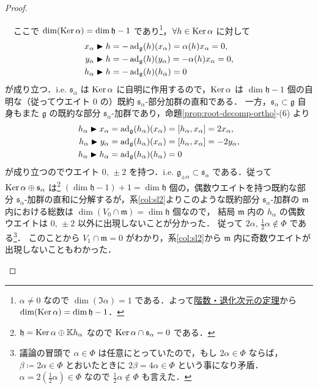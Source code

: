 \documentclass[rep_main]{subfiles}
\begin{document}
\begin{proof}
\begin{description}
		　ここで $\dim (\operatorname{Ker} \alpha) = \dim \mathfrak{h} - 1$ であり\footnote{$\alpha \neq 0$ なので $\dim (\Im \alpha) = 1$ である．よって\hyperref[col:rank-nullity]{階数・退化次元の定理}から $\dim (\operatorname{Ker} \alpha) = \dim \mathfrak{h} - 1$．}，$\forall h \in \operatorname{Ker} \alpha$ に対して
		\begin{align}
			x_\alpha \blacktriangleright h &= -\operatorname{ad}_{\mathfrak{g}}(h)(x_\alpha) = \alpha(h)x_\alpha = 0, \\
			y_\alpha \blacktriangleright h &= -\operatorname{ad}_{\mathfrak{g}}(h)(y_\alpha) = -\alpha(h)x_\alpha = 0, \\
			h_\alpha \blacktriangleright h &= -\operatorname{ad}_{\mathfrak{g}}(h)(h_\alpha) = 0
		\end{align}
		が成り立つ．i.e. $\mathfrak{s}_\alpha$ は $\operatorname{Ker} \alpha$ に自明に作用するので，$\operatorname{Ker} \alpha$ は $\dim \mathfrak{h} - 1$ 個の自明な（従ってウエイト $0$ の）既約 $\mathfrak{s}_\alpha$-部分加群の直和である．
		一方，$\mathfrak{s}_\alpha \subset \mathfrak{g}$ 自身もまた $\mathfrak{g}$ の既約な部分 $\mathfrak{s}_\alpha$-加群であり，命題\ref{prop:root-decomp-ortho}-(6) より
		\begin{align}
			h_\alpha \btr x_\alpha &= \ad_{\mathfrak{g}}(h_\alpha)(x_\alpha) = \comm{h_\alpha}{x_\alpha} = 2x_\alpha, \\
			h_\alpha \btr y_\alpha &= \ad_{\mathfrak{g}}(h_\alpha)(x_\alpha) = \comm{h_\alpha}{x_\alpha} = -2y_\alpha, \\
			h_\alpha \btr h_\alpha &= \ad_{\mathfrak{g}}(h_\alpha)(h_\alpha) = 0
		\end{align}
		が成り立つのでウエイト $0,\, \pm 2$ を持つ．i.e. $\mathfrak{g}_{\pm \alpha} \subset \mathfrak{s}_\alpha$ である．従って $\operatorname{Ker} \alpha \oplus \mathfrak{s}_\alpha$ は\footnote{$\mathfrak{h} = \operatorname{Ker} \alpha \oplus \mathbb{K}h_\alpha$ なので $\operatorname{Ker} \alpha \cap \mathfrak{s}_\alpha = 0$ である．} 
		$(\dim \mathfrak{h} - 1) + 1 = \dim \mathfrak{h}$ 個の，偶数ウエイトを持つ既約な部分 $\mathfrak{s}_\alpha$-加群の直和に分解するが，系\ref{col:sl2}よりこのような既約部分 $\mathfrak{s}_\alpha$-加群の $\mathfrak{m}$ 内における総数は $\dim (V_0 \cap \mathfrak{m}) = \dim \mathfrak{h}$ 個なので，
		結局 $\mathfrak{m}$ 内の $h_\alpha$ の偶数ウエイトは $0,\, \pm 2$ 以外に出現しないことが分かった．
		従って $2\alpha,\, \frac{1}{2}\alpha \notin \Phi$ である\footnote{議論の冒頭で $\alpha \in \Phi$ は任意にとっていたので，もし $2\alpha \in \Phi$ ならば，$\beta \coloneqq 2\alpha \in \Phi$ とおいたときに $2\beta = 4\alpha \in \Phi$ という事になり矛盾．$\alpha = 2 (\frac{1}{2}\alpha) \in \Phi$ なので $\frac{1}{2}\alpha \notin \Phi$ も言えた．}．
		このことから $V_1 \cap \mathfrak{m} = 0$ がわかり，系\ref{col:sl2}から $\mathfrak{m}$ 内に奇数ウエイトが出現しないこともわかった．

\end{description}
\end{proof}
\end{document}

